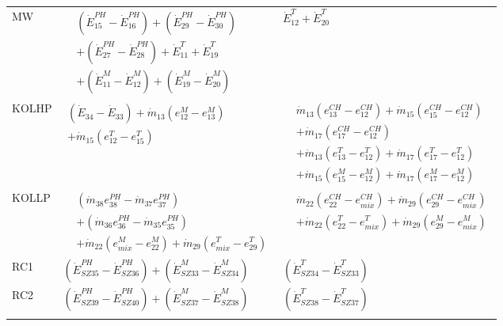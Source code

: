 \begin{landscape}
\begin{table}[p]
\begin{tabular}{lll}
\addlinespace
MW &
$\begin{aligned}
&(\dot{E}^{PH}_{15}-\dot{E}^{PH}_{16})
+(\dot{E}^{PH}_{29}-\dot{E}^{PH}_{30}) \\
&+(\dot{E}^{PH}_{27}-\dot{E}^{PH}_{28})
+\dot{E}^{T}_{11}
+\dot{E}^{T}_{19} \\
&+(\dot{E}^{M}_{11}-\dot{E}^{M}_{12})
+(\dot{E}^{M}_{19}-\dot{E}^{M}_{20})
\end{aligned}$ &
$\dot{E}^{T}_{12}+\dot{E}^{T}_{20}$ \\
\addlinespace
KOLHP &
$\begin{aligned}(\dot{E}_{34}-\dot{E}_{33})
+\dot{m}_{13}(e^{M}_{12}-e^{M}_{13}) \\
+\dot{m}_{15}(e^{T}_{12}-e^{T}_{15})\end{aligned}$ &
$\begin{aligned}
&\dot{m}_{13}(e^{CH}_{13}-e^{CH}_{12})
+\dot{m}_{15}(e^{CH}_{15}-e^{CH}_{12}) \\
&+\dot{m}_{17}(e^{CH}_{17}-e^{CH}_{12}) \\
&+\dot{m}_{13}(e^{T}_{13}-e^{T}_{12})
+\dot{m}_{17}(e^{T}_{17}-e^{T}_{12}) \\
&+\dot{m}_{15}(e^{M}_{15}-e^{M}_{12})
+\dot{m}_{17}(e^{M}_{17}-e^{M}_{12})
\end{aligned}$ \\
KOLLP &
$\begin{aligned}
&(\dot{m}_{38}e^{PH}_{38}-\dot{m}_{37}e^{PH}_{37}) \\
&+(\dot{m}_{36}e^{PH}_{36}-\dot{m}_{35}e^{PH}_{35}) \\
&+\dot{m}_{22}(e^{M}_{mix}-e^{M}_{22})
+\dot{m}_{29}(e^{T}_{mix}-e^{T}_{29})
\end{aligned}$ &
$\begin{aligned}
&\dot{m}_{22}(e^{CH}_{22}-e^{CH}_{mix})
+\dot{m}_{29}(e^{CH}_{29}-e^{CH}_{mix}) \\
&+\dot{m}_{22}(e^{T}_{22}-e^{T}_{mix})
+\dot{m}_{29}(e^{M}_{29}-e^{M}_{mix})
\end{aligned}$ \\

\addlinespace
RC1  &
$(\dot{E}^{PH}_{SZ35}-\dot{E}^{PH}_{SZ36})
+(\dot{E}^{M}_{SZ33}-\dot{E}^{M}_{SZ34})$ &
$(\dot{E}^{T}_{SZ34}-\dot{E}^{T}_{SZ33})$ \\

RC2  &
$(\dot{E}^{PH}_{SZ39}-\dot{E}^{PH}_{SZ40})
+(\dot{E}^{M}_{SZ37}-\dot{E}^{M}_{SZ38})$ &
$(\dot{E}^{T}_{SZ38}-\dot{E}^{T}_{SZ37})$ \\
\addlinespace


\end{tabular}
\end{table}
\end{landscape}
